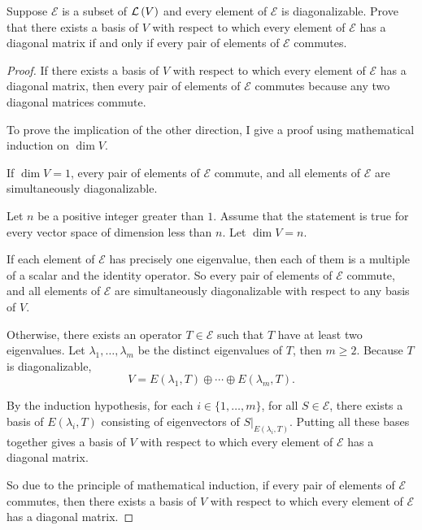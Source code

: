 \begin{exercise}
    Suppose $\mathcal{E}$ is a subset of $\mathcal{L}\left({V}\right)$ and every element of $\mathcal{E}$ is diagonalizable. Prove that there exists a basis of $V$ with respect to which every element of $\mathcal{E}$ has a diagonal matrix if and only if every pair of elements of $\mathcal{E}$ commutes.
\end{exercise}

\begin{proof}
    If there exists a basis of $V$ with respect to which every element of $\mathcal{E}$ has a diagonal matrix, then every pair of elements of $\mathcal{E}$ commutes because any two diagonal matrices commute.

    To prove the implication of the other direction, I give a proof using mathematical induction on $\dim V$.

    If $\dim V = 1$, every pair of elements of $\mathcal{E}$ commute, and all elements of $\mathcal{E}$ are simultaneously diagonalizable.

    Let $n$ be a positive integer greater than $1$. Assume that the statement is true for every vector space of dimension less than $n$. Let $\dim V = n$.

    If each element of $\mathcal{E}$ has precisely one eigenvalue, then each of them is a multiple of a scalar and the identity operator. So every pair of elements of $\mathcal{E}$ commute, and all elements of $\mathcal{E}$ are simultaneously diagonalizable with respect to any basis of $V$.

    Otherwise, there exists an operator $T\in\mathcal{E}$ such that $T$ have at least two eigenvalues. Let $\lambda_{1}, \ldots, \lambda_{m}$ be the distinct eigenvalues of $T$, then $m\geq 2$. Because $T$ is diagonalizable,
    \[
        V = E(\lambda_{1}, T)\oplus \cdots \oplus E(\lambda_{m}, T).
    \]

    By the induction hypothesis, for each $i\in \{ 1, \ldots, m \}$, for all $S\in\mathcal{E}$, there exists a basis of $E(\lambda_{i}, T)$ consisting of eigenvectors of $S\vert_{E(\lambda_{i}, T)}$. Putting all these bases together gives a basis of $V$ with respect to which every element of $\mathcal{E}$ has a diagonal matrix.

    So due to the principle of mathematical induction, if every pair of elements of $\mathcal{E}$ commutes, then there exists a basis of $V$ with respect to which every element of $\mathcal{E}$ has a diagonal matrix.
\end{proof}
\newpage

